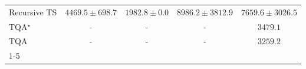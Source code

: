 \begin{tabular}{l|cccc|}
Recursive TS & {\cellcolor[HTML]{9AB8D8}} \color[HTML]{000000} $4469.5\pm 698.7$ & {\cellcolor[HTML]{F2ECF5}} \color[HTML]{000000} $1982.8\pm 0.0$ & {\cellcolor[HTML]{023D60}} \color[HTML]{F1F1F1} $8986.2\pm 3812.9$ & {\cellcolor[HTML]{05659F}} \color[HTML]{F1F1F1} $7659.6\pm 3026.5$ \\
TQA$^\star$ & {\cellcolor[HTML]{000000}} \color[HTML]{F1F1F1} {\cellcolor{white}} \color{black} - & {\cellcolor[HTML]{000000}} \color[HTML]{F1F1F1} {\cellcolor{white}} \color{black} - & {\cellcolor[HTML]{000000}} \color[HTML]{F1F1F1} {\cellcolor{white}} \color{black} - & {\cellcolor[HTML]{C6CCE3}} \color[HTML]{000000} $3479.1$ \\
TQA & {\cellcolor[HTML]{000000}} \color[HTML]{F1F1F1} {\cellcolor{white}} \color{black} - & {\cellcolor[HTML]{000000}} \color[HTML]{F1F1F1} {\cellcolor{white}} \color{black} - & {\cellcolor[HTML]{000000}} \color[HTML]{F1F1F1} {\cellcolor{white}} \color{black} - & {\cellcolor[HTML]{D0D1E6}} \color[HTML]{000000} $3259.2$ \\
\cline{1-5}
\bottomrule
\end{tabular}
